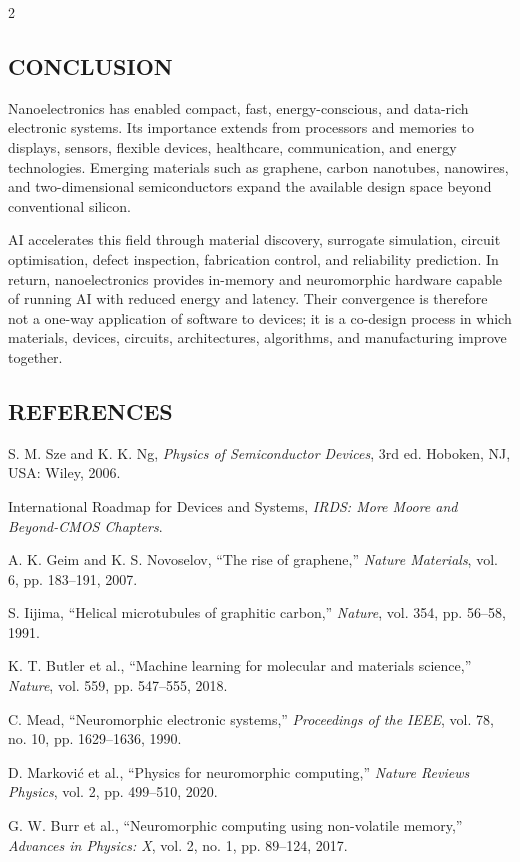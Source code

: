 \begin{multicols}{2}
  \subsection*{\centering\uppercase{Conclusion}}
  Nanoelectronics has enabled compact, fast, energy-conscious, and data-rich electronic systems. Its importance extends from processors and memories to displays, sensors, flexible devices, healthcare, communication, and energy technologies. Emerging materials such as graphene, carbon nanotubes, nanowires, and two-dimensional semiconductors expand the available design space beyond conventional silicon.

  \noindent
  AI accelerates this field through material discovery, surrogate simulation, circuit optimisation, defect inspection, fabrication control, and reliability prediction. In return, nanoelectronics provides in-memory and neuromorphic hardware capable of running AI with reduced energy and latency. Their convergence is therefore not a one-way application of software to devices; it is a co-design process in which materials, devices, circuits, architectures, algorithms, and manufacturing improve together.

  \subsection*{\centering\uppercase{References}}
  {\small
  \begin{justify}
    \begin{enumerate}[label={\relax[\arabic*]},leftmargin=*,labelsep=0.5em,itemsep=0.10em,parsep=0pt]
      \item S. M. Sze and K. K. Ng, \textit{Physics of Semiconductor Devices}, 3rd ed. Hoboken, NJ, USA: Wiley, 2006.
      \item International Roadmap for Devices and Systems, \textit{IRDS: More Moore and Beyond-CMOS Chapters}.
      \item A. K. Geim and K. S. Novoselov, “The rise of graphene,” \textit{Nature Materials}, vol. 6, pp. 183--191, 2007.
      \item S. Iijima, “Helical microtubules of graphitic carbon,” \textit{Nature}, vol. 354, pp. 56--58, 1991.
      \item K. T. Butler et al., “Machine learning for molecular and materials science,” \textit{Nature}, vol. 559, pp. 547--555, 2018.
      \item C. Mead, “Neuromorphic electronic systems,” \textit{Proceedings of the IEEE}, vol. 78, no. 10, pp. 1629--1636, 1990.
      \item D. Markovi\'{c} et al., “Physics for neuromorphic computing,” \textit{Nature Reviews Physics}, vol. 2, pp. 499--510, 2020.
      \item G. W. Burr et al., “Neuromorphic computing using non-volatile memory,” \textit{Advances in Physics: X}, vol. 2, no. 1, pp. 89--124, 2017.
    \end{enumerate}
  \end{justify}}
\end{multicols}

\par\noindent
